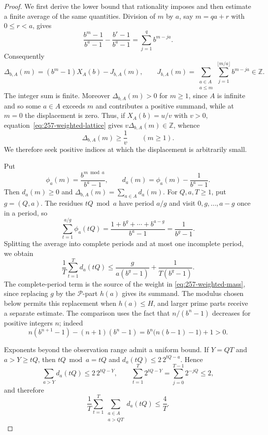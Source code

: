 \documentclass[11pt]{article}
\theoremstyle{plain}
\theoremstyle{definition}
\theoremstyle{remark}
\begin{document}
\begin{proof}
We first derive the lower bound that rationality imposes and then
estimate a finite average of the same quantities. Division of $m$ by $a$, say $m=qa+r$ with
$0\le r<a$, gives
\[
 \frac{b^m-1}{b^a-1}-\frac{b^r-1}{b^a-1}
   =\sum_{j=1}^{q}b^{m-ja}.
\]
Consequently
\begin{equation}\label{eq:257-weighted-lattice}
 \Delta_{b,A}(m)=(b^m-1)X_A(b)-J_{b,A}(m),
 \qquad
 J_{b,A}(m)=
 \sum_{\substack{a\in A\\a\le m}}
 \sum_{j=1}^{\lfloor m/a\rfloor}b^{m-ja}\in\mathbb Z.
\end{equation}
The integer sum is finite. Moreover $\Delta_{b,A}(m)>0$ for $m\ge1$,
since $A$ is infinite and so some $a\in A$ exceeds $m$ and contributes a
positive summand, while at $m=0$ the displacement is zero. Thus, if
$X_A(b)=u/v$ with $v>0$, equation~\eqref{eq:257-weighted-lattice} gives
$v\Delta_{b,A}(m)\in\mathbb Z$, whence
\begin{equation}\label{eq:257-weighted-gap}
 \Delta_{b,A}(m)\ge \frac1v\qquad(m\ge1).
\end{equation}
We therefore seek positive indices at which the displacement is
arbitrarily small.

Put
\[
 \phi_a(m)=\frac{b^{m\bmod a}}{b^a-1},
 \qquad
 d_a(m)=\phi_a(m)-\frac1{b^a-1}.
\]
Then $d_a(m)\ge0$ and $\Delta_{b,A}(m)=\sum_{a\in A}d_a(m)$.
For $Q,a,T\ge1$, put $g=(Q,a)$.  The residues $tQ\bmod a$ have period
$a/g$ and visit $0,g,\ldots,a-g$ once in a period, so
\[
 \sum_{t=1}^{a/g}\phi_a(tQ)
 =\frac{1+b^g+\cdots+b^{a-g}}{b^a-1}
 =\frac1{b^g-1}.
\]
Splitting the average into complete periods and at most one incomplete
period, we obtain
\begin{equation}\label{eq:257-weighted-gcd-average}
 \frac1T\sum_{t=1}^{T}d_a(tQ)
 \le \frac{g}{a(b^g-1)}+\frac1{T(b^g-1)}.
\end{equation}
The complete-period term is the source of the weight in
\eqref{eq:257-weighted-mass}, since replacing $g$ by the $\mathcal P$-part
$h(a)$ gives its summand. The modulus chosen below permits this
replacement when $h(a)\le H$, and larger prime parts receive a separate
estimate. The comparison uses the fact that $n/(b^n-1)$ decreases for
positive integers $n$; indeed
\[
 n(b^{n+1}-1)-(n+1)(b^n-1)
 =b^n\bigl(n(b-1)-1\bigr)+1>0.
\]

Exponents beyond the observation range admit a uniform bound. If
$Y=QT$ and $a>Y\ge tQ$, then $tQ\bmod a=tQ$ and
$d_a(tQ)\le2\,2^{tQ-a}$.  Hence
\[
 \sum_{a>Y}d_a(tQ)\le2\,2^{tQ-Y},
 \qquad
 \sum_{t=1}^{T}2^{tQ-Y}
 =\sum_{j=0}^{T-1}2^{-jQ}\le2,
\]
and therefore
\begin{equation}\label{eq:257-weighted-outer}
 \frac1T\sum_{t=1}^{T}
 \sum_{\substack{a\in A\\a>QT}}d_a(tQ)\le\frac4T.
\end{equation}


\end{proof}
\end{document}
